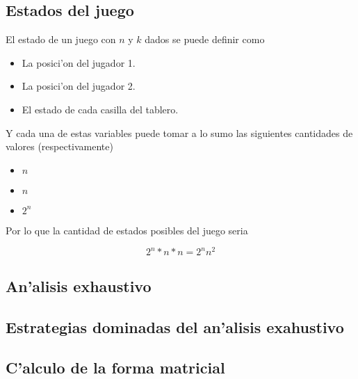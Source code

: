 \subsection{Estados del juego}
El estado de un juego con $n$ y $k$ dados se puede definir como

\begin{itemize}
\item La posici'on del jugador 1.
\item La posici'on del jugador 2.
\item El estado de cada casilla del tablero.
\end{itemize}

Y cada una de estas variables puede tomar a lo sumo las siguientes cantidades de valores (respectivamente)

\begin{itemize}
\item $n$
\item $n$
\item $2^n$
\end{itemize}

Por lo que la cantidad de estados posibles del juego seria

$$2^n * n * n = 2^n n^2$$



\subsection{An'alisis exhaustivo}



\subsection{Estrategias dominadas del an'alisis exahustivo}


\subsection{C'alculo de la forma matricial}


